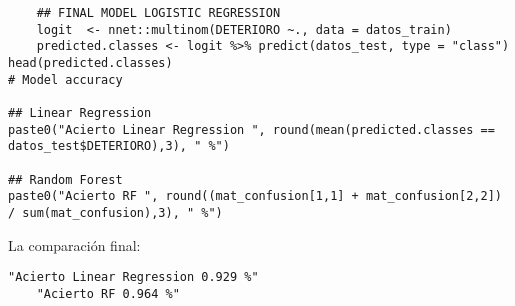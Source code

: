 \begin{lstlisting}
    ## FINAL MODEL LOGISTIC REGRESSION
    logit  <- nnet::multinom(DETERIORO ~., data = datos_train)
    predicted.classes <- logit %>% predict(datos_test, type = "class")
head(predicted.classes)
# Model accuracy

## Linear Regression
paste0("Acierto Linear Regression ", round(mean(predicted.classes == datos_test$DETERIORO),3), " %")

## Random Forest
paste0("Acierto RF ", round((mat_confusion[1,1] + mat_confusion[2,2]) / sum(mat_confusion),3), " %")
\end{lstlisting}

La comparación final: 

\begin{lstlisting}[style=mystyle]
    "Acierto Linear Regression 0.929 %"
    "Acierto RF 0.964 %"
\end{lstlisting}



